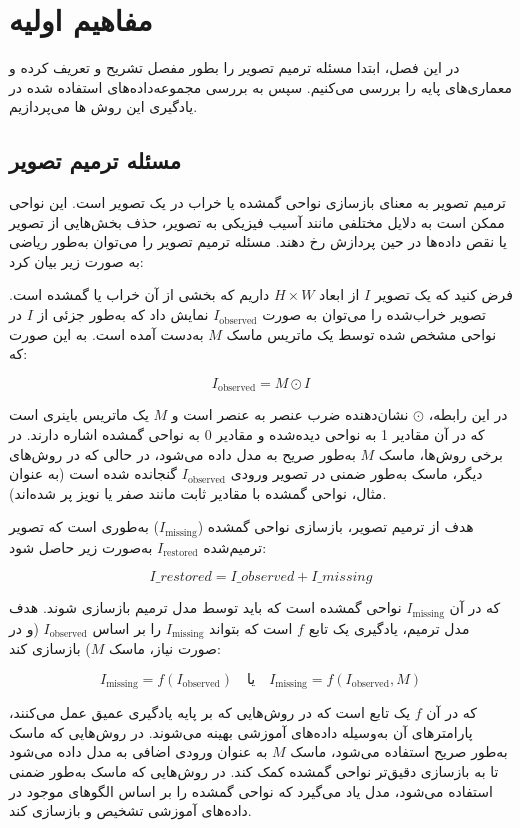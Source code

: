 
\chapter{مفاهیم اولیه}

در این فصل،‌ ابتدا مسئله ترمیم تصویر را بطور مفصل تشریح و تعریف کرده و معماری‌های پایه را بررسی می‌کنیم. سپس به بررسی مجموعه‌داده‌های استفاده شده در یادگیری این روش ها می‌پردازیم.

\section{مسئله ترمیم تصویر}


ترمیم تصویر به معنای بازسازی نواحی گمشده یا خراب در یک تصویر است. این نواحی ممکن است به دلایل مختلفی مانند آسیب فیزیکی به تصویر، حذف بخش‌هایی از تصویر یا نقص داده‌ها در حین پردازش رخ دهند. مسئله ترمیم تصویر را می‌توان به‌طور ریاضی به صورت زیر بیان کرد:

فرض کنید که یک تصویر \(I\) از ابعاد \(H \times W\) داریم که بخشی از آن خراب یا گمشده است. تصویر خراب‌شده را می‌توان به صورت \(I_{\text{observed}}\) نمایش داد که به‌طور جزئی از \(I\) در نواحی مشخص شده توسط یک ماتریس ماسک \(M\) به‌دست آمده است. به این صورت که:

\[
I_{\text{observed}} = M \odot I
\]

در این رابطه، \(\odot\) نشان‌دهنده ضرب عنصر به عنصر است و \(M\) یک ماتریس باینری است که در آن مقادیر 1 به نواحی دیده‌شده و مقادیر 0 به نواحی گمشده اشاره دارند. در برخی روش‌ها، ماسک \(M\) به‌طور صریح به مدل داده می‌شود، در حالی که در روش‌های دیگر، ماسک به‌طور ضمنی در تصویر ورودی \(I_{\text{observed}}\) گنجانده شده است (به عنوان مثال، نواحی گمشده با مقادیر ثابت مانند صفر یا نویز پر شده‌اند).

هدف از ترمیم تصویر، بازسازی نواحی گمشده (\(I_{\text{missing}}\)) به‌طوری است که تصویر ترمیم‌شده \(I_{\text{restored}}\) به‌صورت زیر حاصل شود:

\[
I\_{restored} = I\_{observed} + I\_{missing}
\]

که در آن \(I_{\text{missing}}\) نواحی گمشده است که باید توسط مدل ترمیم بازسازی شوند. هدف مدل ترمیم، یادگیری یک تابع \(f\) است که بتواند \(I_{\text{missing}}\) را بر اساس \(I_{\text{observed}}\) (و در صورت نیاز، ماسک \(M\)) بازسازی کند:

\[
I_{\text{missing}} = f(I_{\text{observed}}) \quad \text{یا} \quad I_{\text{missing}} = f(I_{\text{observed}}, M)
\]

که در آن \(f\) یک تابع است که در روش‌هایی که بر پایه یادگیری عمیق عمل می‌کنند، پارامترهای آن به‌وسیله داده‌های آموزشی بهینه می‌شوند. در روش‌هایی که ماسک به‌طور صریح استفاده می‌شود، ماسک \(M\) به عنوان ورودی اضافی به مدل داده می‌شود تا به بازسازی دقیق‌تر نواحی گمشده کمک کند. در روش‌هایی که ماسک به‌طور ضمنی استفاده می‌شود، مدل یاد می‌گیرد که نواحی گمشده را بر اساس الگوهای موجود در داده‌های آموزشی تشخیص و بازسازی کند.

